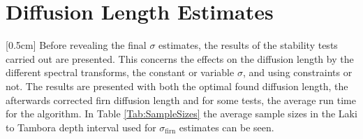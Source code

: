 \documentclass[../../CompleteThesis2/Complete_2ndDraft]{subfiles}
\begin{document}
\section[Diffusion Lengths]{Diffusion Length Estimates}
\label{Sec:Results_DiffLenEst}
[0.5cm]%
Before revealing the final $\sigma$ estimates, the results of the stability tests carried out are presented. This concerns the effects on the diffusion length by the different spectral transforms, the constant or variable $\sigma$, and using constraints or not. The results are presented with both the optimal found diffusion length, the afterwards corrected firn diffusion length and for some tests, the average run time for the algorithm. In Table \ref{Tab:SampleSizes} the average sample sizes in the Laki to Tambora depth interval used for $\sigma_{\text{firn}}$ estimates can be seen.




%
%
%
%
%
%
%
\end{document}

